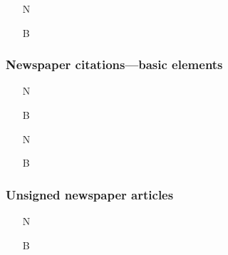 \documentclass[11pt,letterpaper,oneside]{article}
\begin{document}
\begin{itemize}
\item[N] 

\item[B] 
\end{itemize}



\setcounter{subsubsection}{202}
\subsubsection{Newspaper citations---basic elements}

\begin{itemize}
\item[N] 

\item[B] 

\item[N] 

\item[B] 
\end{itemize}


\setcounter{subsubsection}{206}
\subsubsection{Unsigned newspaper articles}

\begin{itemize}
\item[N] 

\item[B] 
\end{itemize}
\end{document}
